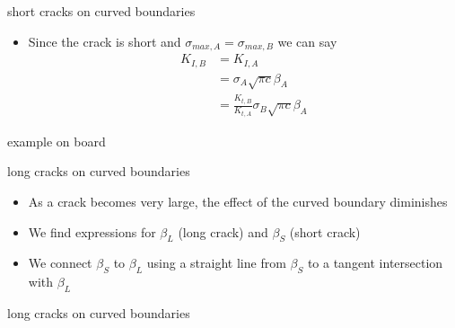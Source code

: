 \documentclass[10pt,handout]{beamer}
\begin{document}
\begin{frame}{short cracks on curved boundaries}
	\begin{itemize}
		\item Since the crack is short and $\sigma_{max,A} = \sigma_{max,B}$ we can say
		\begin{align*}
		K_{I,B} &= K_{I,A}\\
		&= \sigma_A \sqrt{\pi c} \beta_A\\
		&= \frac{K_{t,B}}{K_{t,A}}\sigma_B \sqrt{\pi c} \beta_A
		\end{align*}
	\end{itemize}
\end{frame}

\begin{frame}{example}
	on board
\end{frame}

\begin{frame}{long cracks on curved boundaries}
	\begin{itemize}
		\item As a crack becomes very large, the effect of the curved boundary diminishes
		\item We find expressions for $\beta_L$ (long crack) and $\beta_S$ (short crack)
		\item We connect $\beta_S$ to $\beta_L$ using a straight line from $\beta_S$ to a tangent intersection with $\beta_L$
	\end{itemize}
\end{frame}

\begin{frame}{long cracks on curved boundaries}
	\begin{figure}
	\end{figure}
\end{frame}
\end{document}
